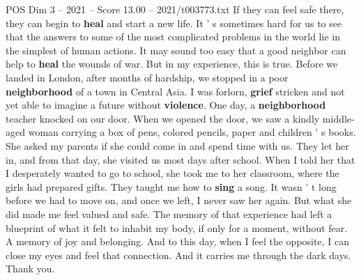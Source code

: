 \begin{textsample}{POS Dim 3 – 2021 – Score 13.00 – 2021/t003773.txt}
If they can feel safe there, they can begin to \textbf{heal} and start a new life.
It ' s sometimes hard for us to see that the answers to some of the most complicated problems in the world lie in the simplest of human actions.
It may sound too easy that a good neighbor can help to \textbf{heal} the wounds of war.
But in my experience, this is true.
Before we landed in London, after months of hardship, we stopped in a poor \textbf{neighborhood} of a town in Central Asia.
I was forlorn, \textbf{grief} stricken and not yet able to imagine a future without \textbf{violence}.
One day, a \textbf{neighborhood} teacher knocked on our door.
When we opened the door, we saw a kindly middle-aged woman carrying a box of pens, colored pencils, paper and children ' s books.
She asked my parents if she could come in and spend time with us.
They let her in, and from that day, she visited us most days after school.
When I told her that I desperately wanted to go to school, she took me to her classroom, where the girls had prepared gifts.
They taught me how to \textbf{sing} a song.
It wasn ' t long before we had to move on, and once we left, I never saw her again.
But what she did made me feel valued and safe.
The memory of that experience had left a blueprint of what it felt to inhabit my body, if only for a moment, without fear.
A memory of joy and belonging.
And to this day, when I feel the opposite, I can close my eyes and feel that connection.
And it carries me through the dark days.
Thank you.

\end{textsample}
